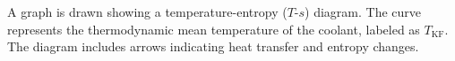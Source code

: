 A graph is drawn showing a temperature-entropy (\(T\)-\(s\)) diagram. The curve represents the thermodynamic mean temperature of the coolant, labeled as \(T_{\text{KF}}\). The diagram includes arrows indicating heat transfer and entropy changes.